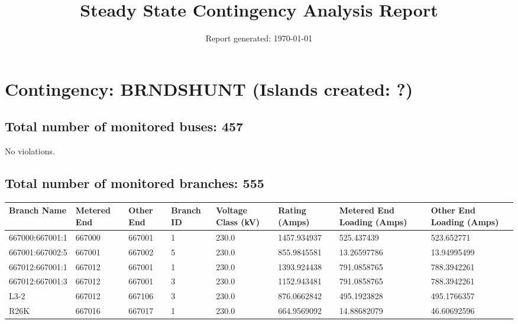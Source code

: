 \documentclass{article}%
\title{Steady State Contingency Analysis Report\vspace{-3ex}}%
\date{Report generated: \today\vspace{-2ex}}%
\begin{document}
%
\normalsize%
\maketitle%
\section*{Contingency: BRNDSHUNT (Islands created: ?)}%
\label{sec:ContingencyBRNDSHUNT(Islandscreated?)}%
\subsection*{Total number of monitored buses: 457}%
\label{subsec:Totalnumberofmonitoredbuses457}%
No violations.

%
\subsection*{Total number of monitored branches: 555}%
\label{subsec:Totalnumberofmonitoredbranches555}%
\begin{tabularx}{\columnwidth}{|X|X|X|X|X|X|X|X|}%
\hline%
Branch Name&Metered End&Other End&Branch ID&Voltage Class (kV)&Rating (Amps)&Metered End Loading (Amps)&Other End Loading (Amps)\\%
\hline%
\hline%
667000:667001:1&667000&667001&1&230.0&1457.934937&525.437439&523.652771\\%
\hline%
667001:667002:5&667001&667002&5&230.0&855.9845581&13.26597786&13.94995499\\%
\hline%
667012:667001:1&667012&667001&1&230.0&1393.924438&791.0858765&788.3942261\\%
\hline%
667012:667001:3&667012&667001&3&230.0&1152.943481&791.0858765&788.3942261\\%
\hline%
L3{-}2&667012&667106&3&230.0&876.0662842&495.1923828&495.1766357\\%
\hline%
R26K&667016&667017&1&230.0&664.9569092&14.88682079&46.60692596\\%
\hline%
\end{tabularx}

%
\end{document}

